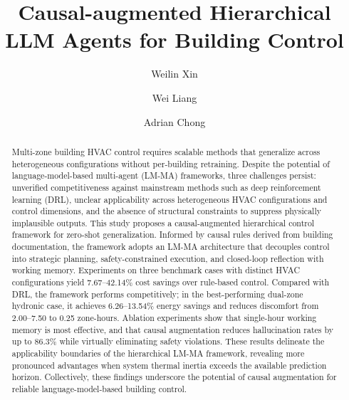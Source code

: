 \documentclass[a4paper]{cas-sc}
\begin{document}
\let\WriteBookmarks\relax
\def\floatpagepagefraction{1}
\def\textpagefraction{.001}



\newcommand{\revise}[1]{\textcolor{blue}{#1}}

\title [mode = title]{Causal-augmented Hierarchical LLM Agents for Building Control}

\author[1]{Weilin Xin}

\author[1]{Wei Liang}

\author[1]{Adrian Chong}
\cormark[1]


\begin{abstract}
Multi-zone building HVAC control requires scalable methods that generalize across heterogeneous configurations without per-building retraining. Despite the potential of language-model-based multi-agent (LM-MA) frameworks, three challenges persist: unverified competitiveness against mainstream methods such as deep reinforcement learning (DRL), unclear applicability across heterogeneous HVAC configurations and control dimensions, and the absence of structural constraints to suppress physically implausible outputs. This study proposes a causal-augmented hierarchical control framework for zero-shot generalization. Informed by causal rules derived from building documentation, the framework adopts an LM-MA architecture that decouples control into strategic planning, safety-constrained execution, and closed-loop reflection with working memory. Experiments on three benchmark cases with distinct HVAC configurations yield 7.67--42.14\% cost savings over rule-based control. Compared with DRL, the framework performs competitively; in the best-performing dual-zone hydronic case, it achieves 6.26--13.54\% energy savings and reduces discomfort from 2.00--7.50 to 0.25 zone-hours. Ablation experiments show that single-hour working memory is most effective, and that causal augmentation reduces hallucination rates by up to 86.3\% while virtually eliminating safety violations. These results delineate the applicability boundaries of the hierarchical LM-MA framework, revealing more pronounced advantages when system thermal inertia exceeds the available prediction horizon. Collectively, these findings underscore the potential of causal augmentation for reliable language-model-based building control.
\end{abstract}
\end{document}
